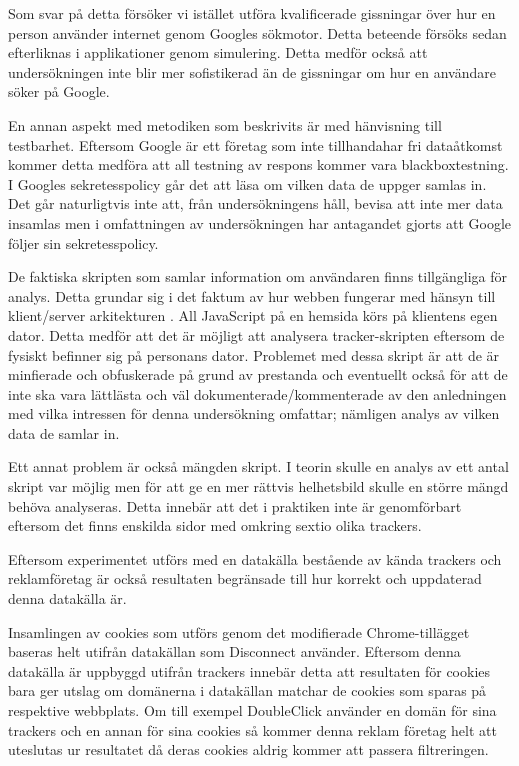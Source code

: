 \documentclass[a4paper,11pt]{article}
\begin{document}
{Som svar på detta försöker vi istället utföra kvalificerade gissningar över hur en person använder internet genom Googles sökmotor. Detta beteende försöks sedan efterliknas i applikationer genom simulering. Detta medför också att undersökningen inte blir mer sofistikerad än de gissningar om hur en användare söker på Google. 

En annan aspekt med metodiken som beskrivits är med hänvisning till testbarhet. Eftersom Google är ett företag som inte tillhandahar fri dataåtkomst kommer detta medföra att all testning av respons kommer vara blackboxtestning. I Googles sekretesspolicy \cite{GooglePrivacyPolicy} går det att läsa om vilken data de uppger samlas in. Det går naturligtvis inte att, från undersökningens håll, bevisa att inte mer data insamlas men i omfattningen av undersökningen har antagandet gjorts att Google följer sin sekretesspolicy.

De faktiska skripten som samlar information om användaren finns tillgängliga för analys. Detta grundar sig i det faktum av hur webben fungerar med hänsyn till klient/server arkitekturen \cite{Dale}. All JavaScript på en hemsida körs på klientens egen dator. Detta medför att det är möjligt att analysera tracker-skripten eftersom de fysiskt befinner sig på personans dator. Problemet med dessa skript är att de är minfierade och obfuskerade på grund av prestanda och eventuellt också för att de inte ska vara lättlästa och väl dokumenterade/kommenterade av den anledningen med vilka intressen för denna undersökning omfattar; nämligen analys av vilken data de samlar in. 

Ett annat problem är också mängden skript. I teorin skulle en analys av ett antal skript var möjlig men för att ge en mer rättvis helhetsbild skulle en större mängd behöva analyseras. Detta innebär att det i praktiken inte är genomförbart eftersom det finns  enskilda sidor med omkring sextio olika trackers.

Eftersom experimentet utförs med en datakälla bestående av kända trackers och reklamföretag är också resultaten begränsade till hur korrekt och uppdaterad denna datakälla är.

Insamlingen av cookies som utförs genom det modifierade Chrome-tillägget baseras helt utifrån datakällan som Disconnect använder. Eftersom denna datakälla är uppbyggd utifrån trackers innebär detta att resultaten för cookies bara ger utslag om domänerna i datakällan matchar de cookies som sparas på respektive webbplats. Om till exempel DoubleClick använder en domän för sina trackers och en annan för sina cookies så kommer denna reklam företag helt att uteslutas ur resultatet då deras cookies aldrig kommer att passera filtreringen.  

}
\end{document}
